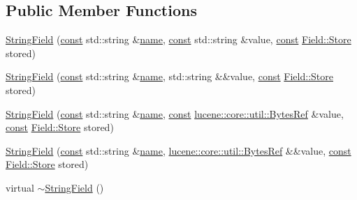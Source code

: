 \subsection*{Public Member Functions}
\begin{DoxyCompactItemize}
\item 
\mbox{\hyperlink{classlucene_1_1core_1_1document_1_1StringField_af114024658947018095142ba97f04658}{String\+Field}} (\mbox{\hyperlink{ZlibCrc32_8h_a2c212835823e3c54a8ab6d95c652660e}{const}} std\+::string \&\mbox{\hyperlink{classlucene_1_1core_1_1document_1_1Field_a52f673f3b3abb14b180f5159f4726537}{name}}, \mbox{\hyperlink{ZlibCrc32_8h_a2c212835823e3c54a8ab6d95c652660e}{const}} std\+::string \&value, \mbox{\hyperlink{ZlibCrc32_8h_a2c212835823e3c54a8ab6d95c652660e}{const}} \mbox{\hyperlink{classlucene_1_1core_1_1document_1_1Field_a7d5d79f0c56d3548ab8d46d0e7dae35d}{Field\+::\+Store}} stored)
\item 
\mbox{\hyperlink{classlucene_1_1core_1_1document_1_1StringField_afec933d8b7bd771b1e00e00e0a5290d0}{String\+Field}} (\mbox{\hyperlink{ZlibCrc32_8h_a2c212835823e3c54a8ab6d95c652660e}{const}} std\+::string \&\mbox{\hyperlink{classlucene_1_1core_1_1document_1_1Field_a52f673f3b3abb14b180f5159f4726537}{name}}, std\+::string \&\&value, \mbox{\hyperlink{ZlibCrc32_8h_a2c212835823e3c54a8ab6d95c652660e}{const}} \mbox{\hyperlink{classlucene_1_1core_1_1document_1_1Field_a7d5d79f0c56d3548ab8d46d0e7dae35d}{Field\+::\+Store}} stored)
\item 
\mbox{\hyperlink{classlucene_1_1core_1_1document_1_1StringField_ac1d3b420656ad92b14efb3c9c955d8a1}{String\+Field}} (\mbox{\hyperlink{ZlibCrc32_8h_a2c212835823e3c54a8ab6d95c652660e}{const}} std\+::string \&\mbox{\hyperlink{classlucene_1_1core_1_1document_1_1Field_a52f673f3b3abb14b180f5159f4726537}{name}}, \mbox{\hyperlink{ZlibCrc32_8h_a2c212835823e3c54a8ab6d95c652660e}{const}} \mbox{\hyperlink{classlucene_1_1core_1_1util_1_1BytesRef}{lucene\+::core\+::util\+::\+Bytes\+Ref}} \&value, \mbox{\hyperlink{ZlibCrc32_8h_a2c212835823e3c54a8ab6d95c652660e}{const}} \mbox{\hyperlink{classlucene_1_1core_1_1document_1_1Field_a7d5d79f0c56d3548ab8d46d0e7dae35d}{Field\+::\+Store}} stored)
\item 
\mbox{\hyperlink{classlucene_1_1core_1_1document_1_1StringField_a33a7cc4352b3c8740bcca051c2ee3021}{String\+Field}} (\mbox{\hyperlink{ZlibCrc32_8h_a2c212835823e3c54a8ab6d95c652660e}{const}} std\+::string \&\mbox{\hyperlink{classlucene_1_1core_1_1document_1_1Field_a52f673f3b3abb14b180f5159f4726537}{name}}, \mbox{\hyperlink{classlucene_1_1core_1_1util_1_1BytesRef}{lucene\+::core\+::util\+::\+Bytes\+Ref}} \&\&value, \mbox{\hyperlink{ZlibCrc32_8h_a2c212835823e3c54a8ab6d95c652660e}{const}} \mbox{\hyperlink{classlucene_1_1core_1_1document_1_1Field_a7d5d79f0c56d3548ab8d46d0e7dae35d}{Field\+::\+Store}} stored)
\item 
virtual \mbox{\hyperlink{classlucene_1_1core_1_1document_1_1StringField_a36b6607f9e292e3d2eb8beded051591e}{$\sim$\+String\+Field}} ()
\end{DoxyCompactItemize}
